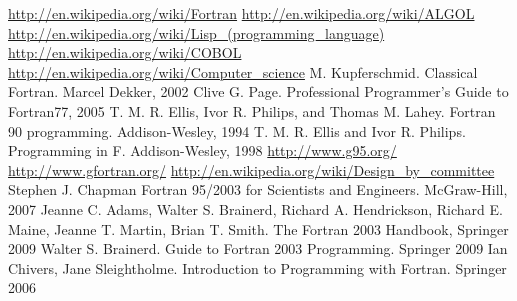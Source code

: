\documentclass[a4paper]{article}
\begin{document}
\begin{thebibliography}{99}
\href{http://en.wikipedia.org/wiki/Fortran}{http://en.wikipedia.org/wiki/Fortran}
\href{http://en.wikipedia.org/wiki/ALGOL}{http://en.wikipedia.org/wiki/ALGOL}
 \href{http://en.wikipedia.org/wiki/Lisp_(programming_language)}{http://en.wikipedia.org/wiki/Lisp\_(programming\_language)}
 \href{http://en.wikipedia.org/wiki/COBOL}{http://en.wikipedia.org/wiki/COBOL}
\href{http://en.wikipedia.org/wiki/Computer_science}{http://en.wikipedia.org/wiki/Computer\_science}
 M. Kupferschmid. Classical Fortran. Marcel Dekker, 2002 
 Clive G. Page. Professional Programmer's Guide to Fortran77, 2005
 T. M. R. Ellis, Ivor R. Philips, and Thomas M. Lahey. Fortran 90 programming. Addison-Wesley, 1994
 T. M. R. Ellis and Ivor R. Philips. Programming in F. Addison-Wesley, 1998
\href{http://www.g95.org/}{http://www.g95.org/}
\href{http://www.gfortran.org/}{http://www.gfortran.org/}
 \href{http://en.wikipedia.org/wiki/Design_by_committee}{http://en.wikipedia.org/wiki/Design\_by\_committee}
 Stephen J. Chapman Fortran 95/2003 for Scientists and Engineers. McGraw-Hill, 2007
 Jeanne C. Adams, Walter S. Brainerd, Richard A. Hendrickson, Richard E. Maine, Jeanne T. Martin, Brian T. Smith. The Fortran 2003 Handbook, Springer 2009
 Walter S. Brainerd. Guide to Fortran 2003 Programming. Springer 2009
 Ian Chivers, Jane Sleightholme. Introduction to Programming with Fortran. Springer 2006

\end{thebibliography}
\end{document}

